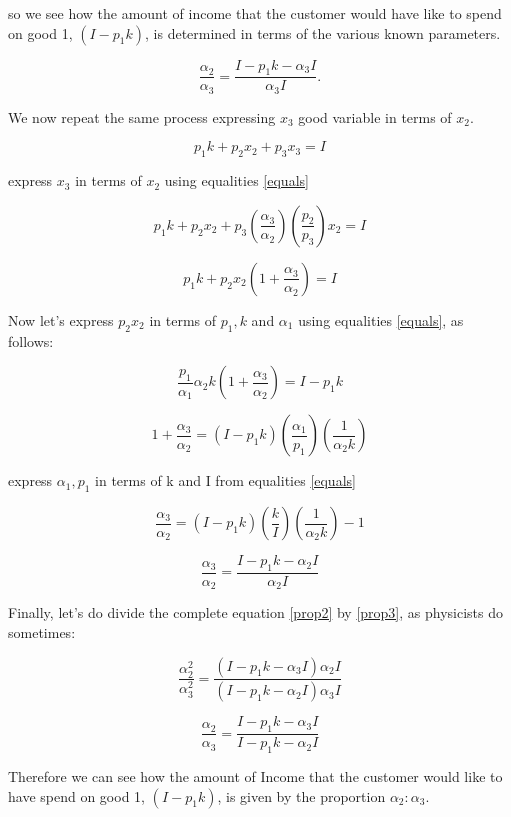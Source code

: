 \documentclass{article}
\begin{document}
so we see how the amount of income that the customer would have like to spend on good 1, $(I - p_1k)$, is determined in terms of the various known parameters.

\begin{equation}\label{prop2}
  \frac{\alpha_2}{\alpha_3} = \frac{I - p_1k - \alpha_3I}{\alpha_3 I}.
\end{equation}

We now repeat the same process expressing $x_3$ good variable in terms of $x_2$.

\begin{equation}
  p_1k + p_2 x_2 + p_3x_3 = I
\end{equation}

express $x_3$ in terms of $x_2$ using equalities \ref{equals}

\begin{equation}
  p_1k + p_2 x_2 + p_3 \left( \frac{\alpha_3}{\alpha_2} \right) \left( \frac{p_2}{p_3} \right)x_2 = I
\end{equation}

\begin{equation}
  p_1k + p_2 x_2 \left( 1 +  \frac{\alpha_3}{\alpha_2} \right) = I
\end{equation}

Now let's express $p_2x_2$ in terms of $p_1, k$ and $\alpha_1$ using equalities \ref{equals}, as follows:

\begin{equation}
  \frac{p_1}{\alpha_1} \alpha_2 k \left( 1 +  \frac{\alpha_3}{\alpha_2} \right) = I - p_1k
\end{equation}

\begin{equation}
  1 +  \frac{\alpha_3}{\alpha_2} =( I - p_1k) \left( \frac{\alpha_1}{p_1} \right) \left( \frac{1}{\alpha_2 k} \right)
\end{equation}

express $\alpha_1, p_1$ in terms of k and I from equalities \ref{equals}

\begin{equation}
  \frac{\alpha_3}{\alpha_2} =( I - p_1k) \left( \frac{k}{I} \right) \left( \frac{1}{\alpha_2 k} \right)- 1
\end{equation}

\begin{equation}\label{prop3}
  \frac{\alpha_3}{\alpha_2} = \frac{ I - p_1k - \alpha_2 I}{\alpha_2 I}
\end{equation}

Finally, let's do divide the complete equation \ref{prop2} by \ref{prop3}, as physicists do sometimes:

\begin{equation}
  \frac{\alpha_2^2}{\alpha_3^2} = \frac{(I - p_1k - \alpha_3 I)\alpha_2 I}{(I - p_1k - \alpha_2 I)\alpha_3 I}
\end{equation}

\begin{equation}
  \frac{\alpha_2}{\alpha_3} = \frac{I - p_1k - \alpha_3 I}{I - p_1k - \alpha_2 I}
\end{equation}

Therefore we can see how the amount of Income that the customer would like to have spend on good 1, $(I - p_1k)$, is given by the proportion $\alpha_2 : \alpha_3$.
\end{document}
